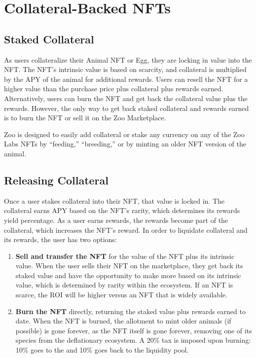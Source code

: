 \section{Collateral-Backed NFTs}
\label{sec:collateral-backed}

\subsection{Staked Collateral}

As users collateralize their Animal NFT or Egg, they are locking in value into the NFT. The NFT's intrinsic value is based on scarcity, and collateral is multiplied by the APY of the animal for additional rewards. Users can resell the NFT for a higher value than the purchase price plus collateral plus rewards earned. Alternatively, users can burn the NFT and get back the collateral value plus the rewards. However, the only way to get back staked collateral and rewards earned is to burn the NFT or sell it on the Zoo Marketplace.

Zoo is designed to easily add collateral or stake any currency on any of the Zoo Labs NFTs by ``feeding,'' ``breeding,'' or by minting an older NFT version of the animal.

\subsection{Releasing Collateral}

Once a user stakes collateral into their NFT, that value is locked in. The collateral earns APY based on the NFT's rarity, which determines its rewards yield percentage. As a user earns rewards, the rewards become part of the collateral, which increases the NFT's reward. In order to liquidate collateral and its rewards, the user has two options:

\begin{enumerate}[label=\Alph*.]
\item \textbf{Sell and transfer the NFT} for the value of the NFT plus its intrinsic value. When the user sells their NFT on the marketplace, they get back its staked value and have the opportunity to make more based on its intrinsic value, which is determined by rarity within the ecosystem. If an NFT is scarce, the ROI will be higher versus an NFT that is widely available.

\item \textbf{Burn the NFT} directly, returning the staked value plus rewards earned to date. When the NFT is burned, the allotment to mint older animals (if possible) is gone forever, as the NFT itself is gone forever, removing one of its species from the deflationary ecosystem. A 20\% tax is imposed upon burning: 10\% goes to the \DAO{} and 10\% goes back to the liquidity pool.
\end{enumerate}

